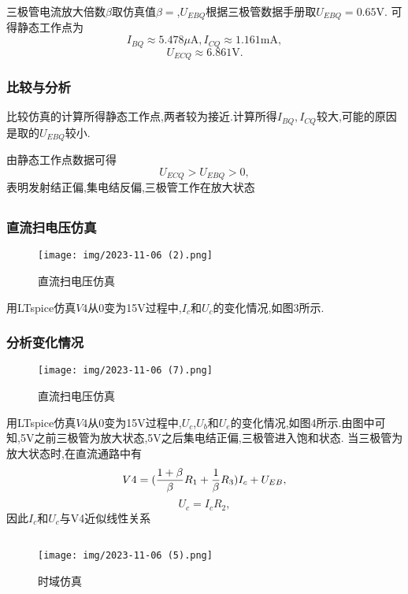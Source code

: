 \documentclass[12pt, a4paper, oneside]{ctexart}
\begin{document}
            三极管电流放大倍数$\beta$取仿真值$\beta=$,$U_{EBQ}$根据三极管数据手册取$U_{EBQ}=0.65 \text{V}$.
            可得静态工作点为
            $$
            I_{BQ}\approx5.478\mu\text{A},I_{CQ}\approx1.161\text{mA},
            $$
            $$
            U_{ECQ}\approx6.861\text{V}.
            $$
        \subsubsection{比较与分析}  
        比较仿真的计算所得静态工作点,两者较为接近.计算所得$I_{BQ},I_{CQ}$较大,可能的原因是取的$U_{EBQ}$较小.

        由静态工作点数据可得
        $$
        U_{ECQ} > U_{EBQ} >0,
        $$
        表明发射结正偏,集电结反偏,三极管工作在放大状态

        \newpage
        \subsection{}
        \subsubsection{直流扫电压仿真}
        \begin{figure}[h]
            \centering
            \texttt{[image: img/2023-11-06 (2).png]}
            \caption{直流扫电压仿真}
        \end{figure}

        用LTspice仿真$V4$从0变为15V过程中,$I_c$和$U_c$的变化情况,如图3所示.
        \subsubsection{分析变化情况}
        \begin{figure}[h]
            \centering
            \texttt{[image: img/2023-11-06 (7).png]}
            \caption{直流扫电压仿真}
        \end{figure}
        用LTspice仿真$V4$从0变为15V过程中,$U_c$,$U_b$和$U_e$的变化情况,如图4所示.由图中可知,5V之前三极管为放大状态,5V之后集电结正偏,三极管进入饱和状态.
        当三极管为放大状态时,在直流通路中有
        $$
        V4=({1+\beta \over \beta}R_1+{1 \over \beta} R_3)I_c+U_{EB},
        $$
        $$
        U_c=I_cR_2,
        $$
        因此$I_c$和$U_c$与V4近似线性关系


        

        

        \subsection{}
        \begin{figure}[h]
            \centering
            \texttt{[image: img/2023-11-06 (5).png]}
            \caption{时域仿真}
        \end{figure}
        
\end{document}
